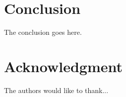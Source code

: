 \documentclass[10pt,conference]{IEEEtran}
\begin{document}




\section{Conclusion}
\label{sec:conclusion}
The conclusion goes here.






\section*{Acknowledgment}


The authors would like to thank...









%
%





\end{document}
